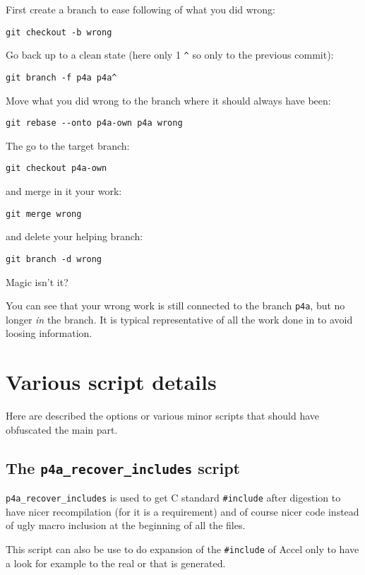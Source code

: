 \documentclass[a4paper]{article}
\begin{document}
First create a branch to ease following of what you did wrong:
\begin{verbatim}
git checkout -b wrong
\end{verbatim}
Go back up to a clean state (here only 1 \verb|^| so only to the previous
commit):
\begin{verbatim}
git branch -f p4a p4a^
\end{verbatim}
Move what you did wrong to the branch where it should always have been:
\begin{verbatim}
git rebase --onto p4a-own p4a wrong
\end{verbatim}
The go to the target branch:
\begin{verbatim}
git checkout p4a-own
\end{verbatim}
and merge in it your work:
\begin{verbatim}
git merge wrong
\end{verbatim}
and delete your helping branch:
\begin{verbatim}
git branch -d wrong
\end{verbatim}
Magic isn't it? \smiley

You can see that your wrong work is still connected to the branch
\texttt{p4a}, but no longer \emph{in} the branch. It is typical
representative of all the work done in \Apfa to avoid loosing information.


\appendix

\section{Various script details}
\label{sec:vari-script-deta}

Here are described the options or various minor scripts that should have
obfuscated the main part.

\subsection{The \protect\texttt{p4a\_recover\_includes} script}
\label{sec:p4a_recover_includes}

\verb|p4a_recover_includes| is used to get C standard \verb|#include|
after \Apips digestion to have nicer recompilation (for \Acuda it is a
requirement) and of course nicer code instead of ugly macro inclusion at
the beginning of all the files.

This script can also be use to do expansion of the \verb|#include| of
\Apfa Accel only to have a look for example to the real \Acuda or \Aopenmp
that is generated.
\end{document}
